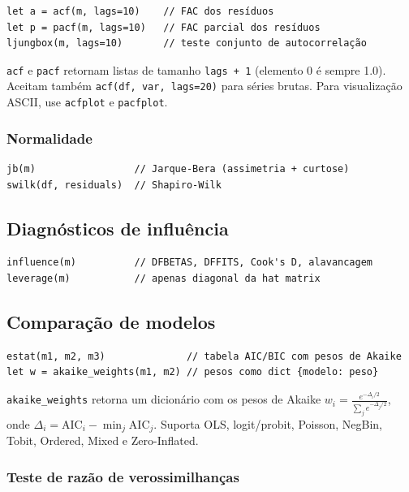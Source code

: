 \begin{lstlisting}
let a = acf(m, lags=10)    // FAC dos resíduos
let p = pacf(m, lags=10)   // FAC parcial dos resíduos
ljungbox(m, lags=10)       // teste conjunto de autocorrelação
\end{lstlisting}

\texttt{acf} e \texttt{pacf} retornam listas de tamanho \texttt{lags + 1}
(elemento 0 é sempre 1.0). Aceitam também \texttt{acf(df, var, lags=20)} para
séries brutas. Para visualização ASCII, use \texttt{acfplot} e \texttt{pacfplot}.

\subsubsection*{Normalidade}

\begin{lstlisting}
jb(m)                 // Jarque-Bera (assimetria + curtose)
swilk(df, residuals)  // Shapiro-Wilk
\end{lstlisting}

\subsection{Diagnósticos de influência}

\begin{lstlisting}
influence(m)          // DFBETAS, DFFITS, Cook's D, alavancagem
leverage(m)           // apenas diagonal da hat matrix
\end{lstlisting}

\subsection{Comparação de modelos}

\begin{lstlisting}
estat(m1, m2, m3)              // tabela AIC/BIC com pesos de Akaike
let w = akaike_weights(m1, m2) // pesos como dict {modelo: peso}
\end{lstlisting}

\texttt{akaike\_weights} retorna um dicionário com os pesos de Akaike
$w_i = \frac{e^{-\Delta_i/2}}{\sum_j e^{-\Delta_j/2}}$, onde $\Delta_i =
\mathrm{AIC}_i - \min_j \mathrm{AIC}_j$. Suporta OLS, logit/probit, Poisson,
NegBin, Tobit, Ordered, Mixed e Zero-Inflated.

\subsubsection*{Teste de razão de verossimilhanças}

